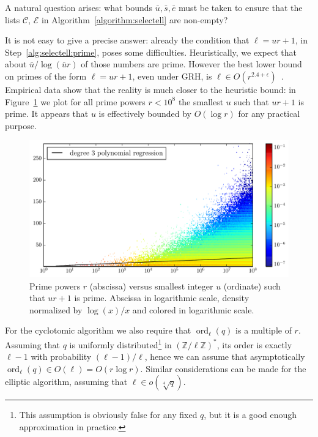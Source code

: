 \documentclass[12pt]{article}
\theoremstyle{plain}
\theoremstyle{definition}
\DeclareMathOperator{\order}{ord} %
\def\Z{\ensuremath{\mathbb{Z}}}
\newcounter{algorithm}
\begin{document}
A natural question arises: what bounds $\bar{u},\bar{s},\bar{e}$ must
be taken to ensure that the lists $\mathcal{C}$, $\mathcal{E}$ in
Algorithm~\ref{algorithm:selectell} are non-empty?

It is not easy to give a precise answer: already the condition that
$\ell=ur+1$, in Step~\ref{alg:selectell:prime}, poses some
difficulties. Heuristically, we expect that about
$\bar{u}/\log(\bar{u}r)$ of those numbers are prime. However the best
lower bound on primes of the form $\ell=ur+1$, even under GRH, is
$\ell\in O(r^{2.4+\epsilon})$~\cite{heath1992zero}. Empirical data
show that the reality is much closer to the heuristic bound: in
Figure~\ref{fig:primes-arith-prog} we plot for all prime powers
$r<10^8$ the smallest $u$ such that $ur+1$ is prime. It appears that
$u$ is effectively bounded by $O(\log r)$ for any practical purpose.


\begin{figure}
  \centering
  \includegraphics[width=\textwidth]{arith_prog}  
  \caption{Prime powers $r$ (abscissa) versus smallest integer $u$
    (ordinate) such that $ur+1$ is prime. Abscissa in logarithmic
    scale, density normalized by $\log(x)/x$ and colored in
    logarithmic scale.}
  \label{fig:primes-arith-prog}
\end{figure}

For the cyclotomic algorithm we also require that $\order_\ell(q)$ is
a multiple of $r$. Assuming that $q$ is uniformly
distributed\footnote{This assumption is obviously false for any fixed
  $q$, but it is a good enough approximation in practice.} in
$(\Z/\ell\Z)^\ast$, its order is exactly $\ell-1$ with probability
$(\ell-1)/\ell$, hence we can assume that asymptotically
$\order_\ell(q)\in O(\ell)=O(r\log r)$. Similar considerations can be
made for the elliptic algorithm, assuming that $\ell\in
o(\sqrt[4]{q})$.
\end{document}
